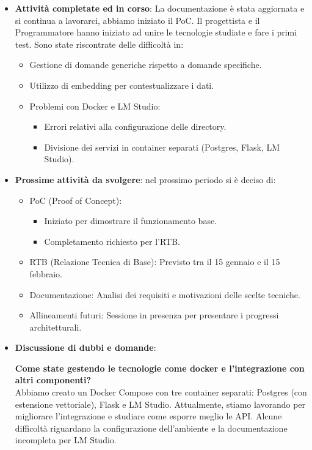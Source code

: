 \begin{itemize}
 \item \textbf{Attività completate ed in corso}: 
 La documentazione è stata aggiornata e si continua a lavorarci, abbiamo iniziato il PoC. Il progettista e il Programmatore hanno iniziato ad unire le tecnologie studiate e fare i primi test.
 Sono state riscontrate delle difficoltà in:
 \begin{itemize}
        \item Gestione di domande generiche rispetto a domande specifiche.
        \item Utilizzo di embedding per contestualizzare i dati.
        \item Problemi con Docker e LM Studio:
       \begin{itemize}
                    \item Errori relativi alla configurazione delle directory.
                    \item Divisione dei servizi in container separati (Postgres, Flask, LM Studio).
        \end{itemize}  
        \end{itemize}
\item \textbf{Prossime attività da svolgere}: nel prossimo periodo si è deciso di:
 \begin{itemize}
        \item PoC (Proof of Concept):
         \begin{itemize}
            \item Iniziato per dimostrare il funzionamento base.
            \item Completamento richiesto per l’RTB.
        \end{itemize}
        \item RTB (Relazione Tecnica di Base): Previsto tra il 15 gennaio e il 15 febbraio.
        \item Documentazione: Analisi dei requisiti e motivazioni delle scelte tecniche.
        \item Allineamenti futuri: Sessione in presenza per presentare i progressi architetturali.

    \end{itemize}


 \item \textbf{Discussione di dubbi e domande}:


\textbf{Come state gestendo le tecnologie come docker e l'integrazione con altri componenti?}\\
Abbiamo creato un Docker Compose con tre container separati: Postgres (con estensione vettoriale), Flask e LM Studio. Attualmente, stiamo lavorando per migliorare l'integrazione e studiare come esporre meglio le API. Alcune difficoltà riguardano la configurazione dell'ambiente e la documentazione incompleta per LM Studio.\\


\end{itemize}
